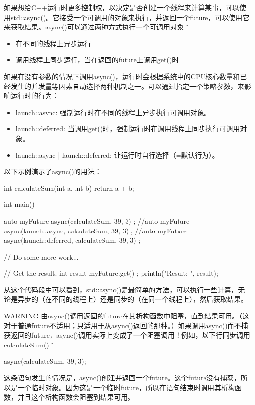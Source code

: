 
如果想给C++运行时更多控制权，以决定是否创建一个线程来计算某事，可以使用std::async()。它接受一个可调用的对象来执行，并返回一个future，可以使用它来获取结果。async()可以通过两种方式执行一个可调用对象：

\begin{itemize}
\item
在不同的线程上异步运行

\item
调用线程上同步运行，当在返回的future上调用get()时
\end{itemize}

如果在没有参数的情况下调用async()，运行时会根据系统中的CPU核心数量和已经发生的并发量等因素自动选择两种机制之一。可以通过指定一个策略参数，来影响运行时的行为：

\begin{itemize}
\item
launch::async: 强制运行时在不同的线程上异步执行可调用对象。

\item
launch::deferred: 当调用get()时，强制运行时在调用线程上同步执行可调用对象。

\item
launch::async | launch::deferred: 让运行时自行选择（=默认行为）。
\end{itemize}

以下示例演示了async()的用法：

\begin{cpp}
int calculateSum(int a, int b) { return a + b; }

int main()
{
    auto myFuture { async(calculateSum, 39, 3) };
    //auto myFuture { async(launch::async, calculateSum, 39, 3) };
    //auto myFuture { async(launch::deferred, calculateSum, 39, 3) };

    // Do some more work...

    // Get the result.
    int result { myFuture.get() };
    println("Result: {}", result);
}
\end{cpp}

从这个代码段中可以看到，std::async()是最简单的方法，可以执行一些计算，无论是异步的（在不同的线程上）还是同步的（在同一个线程上），然后获取结果。

\begin{myWarning}{WARNING}
由async()调用返回的future在其析构函数中阻塞，直到结果可用。（这对于普通future不适用；只适用于从async()返回的那种。）如果调用async()而不捕获返回的future，async()调用实际上变成了一个阻塞调用！例如，以下行同步调用calculateSum()：

\begin{cpp}
async(calculateSum, 39, 3);
\end{cpp}

这条语句发生的情况是，async()创建并返回一个future。这个future没有捕获，所以是一个临时对象。因为这是一个临时future，所以在语句结束时调用其析构函数，并且这个析构函数会阻塞到结果可用。
\end{myWarning}


